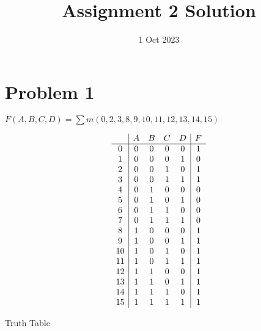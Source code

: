 \documentclass{vhdl-assignment}
\title{Assignment 2 Solution}
\date{1 Oct 2023}
\begin{document}
\maketitle

\section*{Problem 1}

$F(A,B,C,D)=\sum m(0,2,3,8,9,10,11,12,13,14,15)$

\begin{table}[H]
    \centering
    \begin{displaymath}
        \begin{array}{c|c c c c|c}
              & A & B & C & D & F \\
            \hline
            0  & 0 & 0 & 0 & 0 & 1 \\
            1  & 0 & 0 & 0 & 1 & 0 \\
            2  & 0 & 0 & 1 & 0 & 1 \\
            3  & 0 & 0 & 1 & 1 & 1 \\
            4  & 0 & 1 & 0 & 0 & 0 \\
            5  & 0 & 1 & 0 & 1 & 0 \\
            6  & 0 & 1 & 1 & 0 & 0 \\
            7  & 0 & 1 & 1 & 1 & 0 \\
            8  & 1 & 0 & 0 & 0 & 1 \\
            9  & 1 & 0 & 0 & 1 & 1 \\
            10 & 1 & 0 & 1 & 0 & 1 \\
            11 & 1 & 0 & 1 & 1 & 1 \\
            12 & 1 & 1 & 0 & 0 & 1 \\
            13 & 1 & 1 & 0 & 1 & 1 \\
            14 & 1 & 1 & 1 & 0 & 1 \\
            15 & 1 & 1 & 1 & 1 & 1 \\
        \end{array}
    \end{displaymath}
    \caption[short]{Truth Table}
\end{table}
\end{document}
